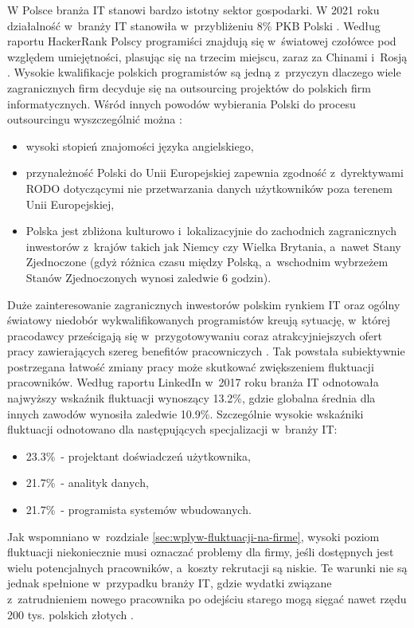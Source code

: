 W Polsce branża IT stanowi bardzo istotny sektor gospodarki.
W 2021 roku działalność w~branży IT stanowiła w~przybliżeniu 8\% PKB Polski \cite{piih-2021}.
Według raportu HackerRank Polscy programiści znajdują się w~światowej czołówce pod względem umiejętności, plasując się na trzecim miejscu, zaraz za Chinami i~Rosją \cite{hackerrank-2021}.
Wysokie kwalifikacje polskich programistów są jedną z~przyczyn dlaczego wiele zagranicznych firm decyduje się na outsourcing projektów do polskich firm informatycznych.
Wśród innych powodów wybierania Polski do procesu outsourcingu wyszczególnić można \cite{softwaremind-2021}:
\begin{itemize}
    \item wysoki stopień znajomości języka angielskiego,
    \item przynależność Polski do Unii Europejskiej zapewnia zgodność z~dyrektywami RODO dotyczącymi nie przetwarzania danych użytkowników poza terenem Unii Europejskiej,
    \item Polska jest zbliżona kulturowo i~lokalizacyjnie do zachodnich zagranicznych inwestorów z~krajów takich jak Niemcy czy Wielka Brytania, a~nawet Stany Zjednoczone (gdyż różnica czasu między Polską, a~wschodnim wybrzeżem Stanów Zjednoczonych wynosi zaledwie 6 godzin).
\end{itemize}

Duże zainteresowanie zagranicznych inwestorów polskim rynkiem IT oraz ogólny światowy niedobór wykwalifikowanych programistów \cite{daxx-2021}
kreują sytuację, w~której pracodawcy prześcigają się w~przygotowywaniu coraz atrakcyjniejszych ofert pracy zawierających szereg benefitów pracowniczych \cite{it-benefits-2020}.
Tak powstała subiektywnie postrzegana łatwość zmiany pracy może skutkować zwiększeniem fluktuacji pracowników.
Według raportu LinkedIn \cite{linkedin-2018} w~2017 roku branża IT odnotowała najwyższy wskaźnik fluktuacji wynoszący 13.2\%, gdzie globalna średnia dla innych zawodów wynosiła zaledwie 10.9\%.
Szczególnie wysokie wskaźniki fluktuacji odnotowano dla następujących specjalizacji w~branży IT:
\begin{itemize}
    \item 23.3\%~- projektant doświadczeń użytkownika,
    \item 21.7\%~- analityk danych,
    \item 21.7\%~- programista systemów wbudowanych.
\end{itemize}

Jak wspomniano w~rozdziale \ref{sec:wplyw-fluktuacji-na-firme}, wysoki poziom fluktuacji niekoniecznie musi oznaczać problemy dla firmy, jeśli dostępnych jest wielu potencjalnych pracowników, a~koszty rekrutacji są niskie.
Te warunki nie są jednak spełnione w~przypadku branży IT, gdzie wydatki związane z~zatrudnieniem nowego pracownika po odejściu starego mogą sięgać nawet rzędu 200 tys. polskich złotych \cite{hairing-dev-2021}.

